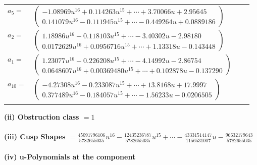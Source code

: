 \documentclass[1p]{elsarticle_modified}
\theoremstyle{definition}
\begin{document}
\begin{tabular}{m{7pt} m{180pt} m{7pt} m{180pt} }
\flushright $a_{5}=$&$\begin{pmatrix}-1.08969 u^{16}+0.114263 u^{15}+\cdots+3.70066 u+2.95645\\0.141079 u^{16}-0.111945 u^{15}+\cdots-0.449264 u+0.0889186\end{pmatrix}$ \\
\flushright $a_{2}=$&$\begin{pmatrix}1.18986 u^{16}-0.118103 u^{15}+\cdots-3.40302 u-2.98180\\0.0172629 u^{16}+0.0956716 u^{15}+\cdots+1.13318 u-0.143448\end{pmatrix}$ \\
\flushright $a_{1}=$&$\begin{pmatrix}1.23077 u^{16}-0.226208 u^{15}+\cdots-4.14992 u-2.86754\\0.0648607 u^{16}+0.00369480 u^{15}+\cdots+0.102878 u-0.137290\end{pmatrix}$ \\
\flushright $a_{10}=$&$\begin{pmatrix}-4.27308 u^{16}-0.233087 u^{15}+\cdots+13.8168 u+17.9997\\0.377489 u^{16}-0.184057 u^{15}+\cdots-1.56233 u-0.0206505\end{pmatrix}$\\&\end{tabular}
\flushleft \textbf{(ii) Obstruction class $= 1$}\\~\\
\flushleft \textbf{(iii) Cusp Shapes $= \frac{45091796106}{5782655035} u^{16}-\frac{12435236787}{5782655035} u^{15}+\cdots-\frac{43331514147}{1156531007} u-\frac{96632179643}{5782655035}$}\\~\\
\newpage\renewcommand{\arraystretch}{1}
\flushleft \textbf{(iv) u-Polynomials at the component}\newline \\
\end{document}
